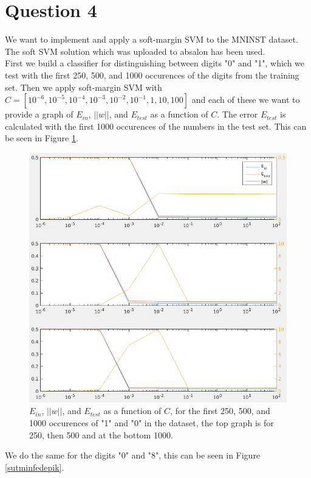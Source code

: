 \documentclass[a4paper]{article}
\begin{document}
\section*{Question 4}
We want to implement and apply a soft-margin SVM to the MNINST dataset. The soft SVM solution which was uploaded to absalon has been used.\\
First we build a classifier for distinguishing between digits "0" and "1", which we test with the first 250, 500, and 1000 occurences of the digits from the training set. Then we apply soft-margin SVM with $C= [10^{-6},10^{-5},10^{-4},10^{-3},10^{-2},10^{-1},1,10,100]$ and each of these we want to provide a graph of $E_{in}$, $||w||$, and $E_{test}$ as a function of $C$. The error $E_{test}$ is calculated with the first 1000 occurences of the numbers in the test set. This can be seen in Figure \ref{jegerhomo}.
\begin{figure}[H]
  \centering
  \includegraphics[width=\textwidth]{./01.png}
  \caption{$E_{in}$, $||w||$, and $E_{test}$ as a function of $C$, for the first 250, 500, and 1000 occurences of "1" and "0" in the dataset, the top graph is for 250, then 500 and at the bottom 1000.}
  \label{jegerhomo}
\end{figure}
\noindent We do the same for the digits "0" and "8", this can be seen in Figure \ref{sutminfedepik}.
\end{document}
